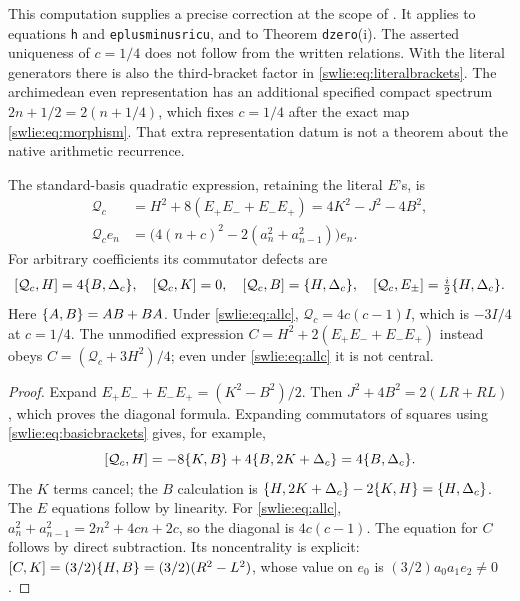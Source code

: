 \documentclass[11pt]{article}
\begin{document}
This computation supplies a precise correction at the scope
of \cite{swlie:CCM}. It applies to equations \texttt{h} and
\texttt{eplusminusricu}, and to Theorem \texttt{dzero}(i).
The asserted uniqueness of $c=1/4$ does not follow from the
written relations. With the literal generators there is
also the third-bracket factor in \eqref{swlie:eq:literalbrackets}.
The archimedean even representation has an additional
specified compact spectrum $2n+1/2=2(n+1/4)$, which fixes
$c=1/4$ after the exact map \eqref{swlie:eq:morphism}.
That extra representation datum is not a theorem about
the native arithmetic recurrence.

\begin{swlieproposition}
\label{swlie:prop:casimir}
The standard-basis quadratic expression, retaining the
literal $E$'s, is
\begin{equation}\label{swlie:eq:Cas}
 \begin{split}
 \mathcal Q_c
 &=H^2+8(E_+E_-+E_-E_+)
   =4K^2-J^2-4B^2,\\
 \mathcal Q_ce_n
 &=\bigl(4(n+c)^2-2(a_n^2+a_{n-1}^2)\bigr)e_n.
 \end{split}
\end{equation}
For arbitrary coefficients its commutator defects are
\begin{equation}\label{swlie:eq:Casdef}
 [\mathcal Q_c,H]=4\{B,\Delta_c\},\quad
 [\mathcal Q_c,K]=0,\quad
 [\mathcal Q_c,B]=\{H,\Delta_c\},\quad
 [\mathcal Q_c,E_\pm]=\tfrac i2\{H,\Delta_c\}.
\end{equation}
Here $\{A,B\}=AB+BA$. Under \eqref{swlie:eq:allc},
$\mathcal Q_c=4c(c-1)I$, which is $-3I/4$ at $c=1/4$.
The unmodified expression
$C=H^2+2(E_+E_-+E_-E_+)$ instead obeys
$C=(\mathcal Q_c+3H^2)/4$; even under
\eqref{swlie:eq:allc} it is not central.
\end{swlieproposition}
\begin{proof}
Expand $E_+E_-+E_-E_+=(K^2-B^2)/2$.
Then $J^2+4B^2=2(LR+RL)$, which proves the diagonal
formula. Expanding commutators of squares using
\eqref{swlie:eq:basicbrackets} gives, for example,
\[
 [\mathcal Q_c,H]
  =-8\{K,B\}+4\{B,2K+\Delta_c\}
  =4\{B,\Delta_c\}.
\]
The $K$ terms cancel; the $B$ calculation is
$\{H,2K+\Delta_c\}-2\{K,H\}=\{H,\Delta_c\}$.
The $E$ equations follow by linearity.
For \eqref{swlie:eq:allc},
$a_n^2+a_{n-1}^2=2n^2+4cn+2c$,
so the diagonal is $4c(c-1)$.
The equation for $C$ follows by direct subtraction.
Its noncentrality is explicit:
$[C,K]=(3/2)\{H,B\}=(3/2)(R^2-L^2)$,
whose value on $e_0$ is $(3/2)a_0a_1e_2\ne0$.
\end{proof}
\end{document}
